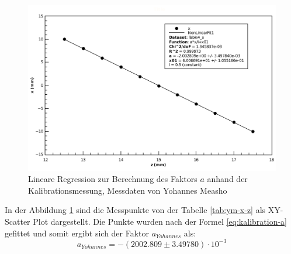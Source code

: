 \begin{figure}[H]
    \center
    \includegraphics[width=.8\textwidth]{images/ym-x-z-fit-a.pdf}
    \caption{Lineare Regression zur Berechnung des Faktors $a$ anhand der Kalibrationsmessung, Messdaten von Yohannes Measho}
    \label{fig:ym-x-z-fit-a}
\end{figure}

In  der  Abbildung \ref{fig:ym-x-z-fit-a} sind die Messpunkte  von  der  Tabelle
\ref{tab:ym-x-z} als XY-Scatter Plot dargestellt. Die  Punkte  wurden  nach  der
Formel  \ref{eq:kalibration-a}   gefittet  und  somit  ergibt  sich  der  Faktor
$a_{Yohannes}$ als:
\begin{equation}
    a_{Yohannes} = -(2002.809 \pm 3.49780)\cdot 10^{-3}
    \label{eq:ym-a}
\end{equation}
